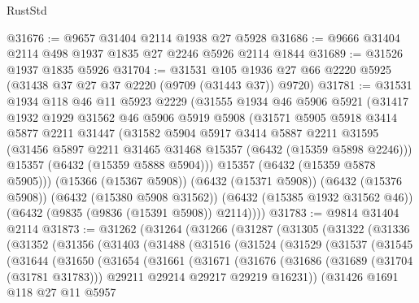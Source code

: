 \begin{lexlean}{RustStd}
\begin{coremodule}
@31676 := @9657 @31404 @2114 @1938 @27 @5928
@31686 := @9666 @31404 @2114 @498 @1937 @1835 @27 @2246 @5926 @2114 @1844
@31689 := @31526 @1937 @1835 @5926
@31704 := @31531
    @105
    @1936
    @27
    @66
    @2220
    @5925
    (@31438 @37 @27 @37 @2220 (@9709 (@31443 @37)) @9720)
@31781 := @31531
    @1934
    @118
    @46
    @11
    @5923
    @2229
    (@31555
      @1934
      @46
      @5906
      @5921
      (@31417
        @1932
        @1929
        @31562
        @46
        @5906
        @5919
        @5908
        (@31571
          @5905
          @5918
          @3414
          @5877
          @2211
          @31447
          (@31582
            @5904
            @5917
            @3414
            @5887
            @2211
            @31595
            (@31456 @5897 @2211 @31465 @31468 @15357 (@6432 (@15359 @5898 @2246)))
            @15357
            (@6432 (@15359 @5888 @5904)))
          @15357
          (@6432 (@15359 @5878 @5905)))
        (@15366 (@15367 @5908))
        (@6432 (@15371 @5908))
        (@6432 (@15376 @5908))
        (@6432 (@15380 @5908 @31562))
        (@6432 (@15385 @1932 @31562 @46))
        (@6432 (@9835 (@9836 (@15391 @5908)) @2114))))
@31783 := @9814 @31404 @2114
@31873 := @31262
    (@31264
      (@31266
        (@31287
          (@31305
            (@31322
              (@31336
                (@31352
                  (@31356
                    (@31403
                      (@31488
                        (@31516
                          (@31524
                            (@31529
                              (@31537
                                (@31545
                                  (@31644
                                    (@31650
                                      (@31654
                                        (@31661
                                          (@31671
                                            (@31676
                                              (@31686
                                                (@31689 (@31704 (@31781 @31783)))
                                                @29211
                                                @29214
                                                @29217
                                                @29219
                                                @16231))
                                            (@31426
                                              @1691
                                              @118
                                              @27
                                              @11
                                              @5957

\end{coremodule}
\end{lexlean}

